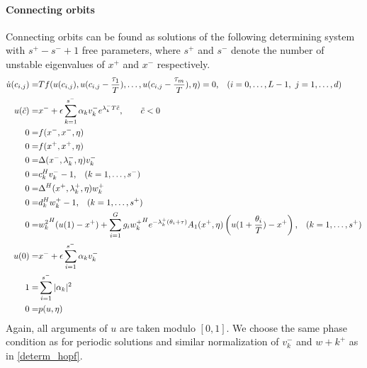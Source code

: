 \documentclass[10pt]{scrartcl}
\begin{document}
{\paragraph{Connecting orbits}
Connecting orbits can be found as solutions of the following
determining system with $s^+-s^-+1$ free parameters, where $s^+$ and
$s^-$ denote the number of unstable eigenvalues of $x^+$ and $x^-$
respectively.
\begin{equation}\label{determ_hcli}
\begin{aligned}
  \dot{u}(c_{i,j})=& Tf(u(c_{i,j}),u(c_{i,j}-\frac{\tau_1}{T}),\ldots,
  u(c_{i,j}-\frac{\tau_m}{T}),\eta)=0\mbox{,\quad}(i=0,\ldots,L-1,\ j=1,\ldots,d) \\
  u(\tilde{c})=&x^{-}+\epsilon
  \sum_{k=1}^{s^{-}}\alpha_{k}v_{k}^{-}e^{\lambda_{k}^{-}T\tilde{c}}, \qquad \tilde{c}<0\\
  0=&f(x^{-},x^{-},\eta)\\
  0=&f(x^{+},x^{+},\eta)\\
  0=&\Delta(x^{-},\lambda_k^-,\eta) v_{k}^{-} \\
  0=&c_k^{H}v_{k}^{-}-1\mbox{,\quad} (k=1,\ldots,s^{-})\\
  0=&\Delta^{H}(x^{+},\lambda_k^+,\eta)w_{k}^{+} \\
  0=&d_k^{H}w_{k}^{+}-1\mbox{,\quad} (k=1,\ldots,s^{+})\\
  0=&{w_{k}^{2}}^{H}(u(1)-x^{+})+\sum_{i=1}^{G}g_i{w_{k}^{+}}^{H}e^{-\lambda_{k}^{+}
    (\theta_i+\tau)}A_{1}(x^{+},\eta)
  \left(u(1+\frac{\theta_i}{T})-x^{+}\right)\mbox{,\quad}(k=1,\ldots,s^+)\\
  u(0)=&x^{-}+\epsilon\sum_{i=1}^{s^{-}}\alpha_{k}v_{k}^{-}\\
  1=&\sum_{i=1}^{s^-}|\alpha_{k}|^{2}\\
  0=&p(u,\eta)
\end{aligned}
\end{equation}
Again, all arguments of $u$ are taken modulo $[0,1]$. We choose the
same phase condition as for periodic solutions and similar
normalization of $v_k^-$ and $w+k^+$ as in \eqref{determ_hopf}.

}
\end{document}
